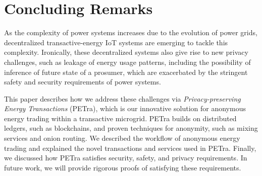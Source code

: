 \section{Concluding Remarks}
\label{sec:concl}

As the complexity of power systems increases due to the evolution of
power grids, decentralized transactive-energy IoT systems are emerging
to tackle this complexity. Ironically, these decentralized systems
also give rise to new privacy challenges, such as leakage of energy usage patterns, including the possibility of inference of future state of a prosumer, 
which are exacerbated by the stringent safety and
security requirements of power systems.

This paper describes how we address these challenges via
\emph{Privacy-preserving Energy Transactions} (PETra), which is our
innovative solution for anonymous energy trading within a transactive
microgrid.  PETra builds on distributed ledgers, such as blockchains,
and proven techniques for anonymity, such as mixing services and onion
routing.  We described the workflow of anonymous energy trading and
explained the novel transactions and services used in PETra.  Finally,
we discussed how PETra satisfies security, safety, and privacy
requirements.  In future work, we will provide rigorous proofs of
satisfying these requirements.
